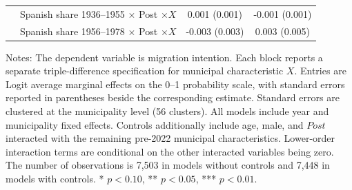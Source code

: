 \begin{table}[!htbp]
\begin{tabular}{llcc}
 & Spanish share 1936--1955 \(\times\) Post \(\times X\) & 0.001 (0.001) & -0.001 (0.001) \\
 & Spanish share 1956--1978 \(\times\) Post \(\times X\) & -0.003 (0.003) & 0.003 (0.005) \\
\hline
\end{tabular}
\par\vspace{1.5mm}
\begin{minipage}{0.98\linewidth}
\footnotesize\setlength{\parindent}{0pt}\setlength{\parskip}{1pt}
Notes: The dependent variable is migration intention. Each block reports a separate triple-difference specification for municipal characteristic \(X\). Entries are Logit average marginal effects on the 0--1 probability scale, with standard errors reported in parentheses beside the corresponding estimate. Standard errors are clustered at the municipality level (56 clusters). All models include year and municipality fixed effects. Controls additionally include age, male, and \(Post\) interacted with the remaining pre-2022 municipal characteristics. Lower-order interaction terms are conditional on the other interacted variables being zero. The number of observations is        7,503 in models without controls and        7,448 in models with controls. * \(p<0.10\), ** \(p<0.05\), *** \(p<0.01\).
\end{minipage}
\end{table}
